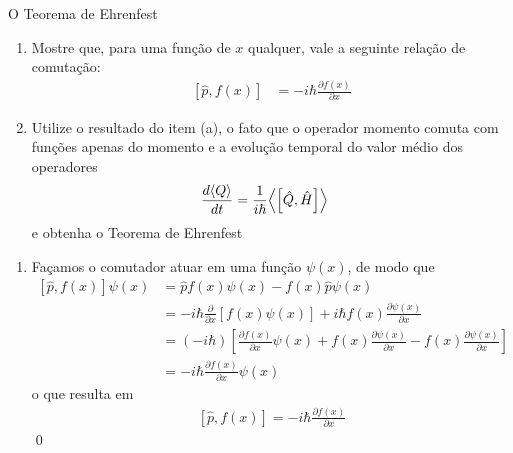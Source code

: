 \begin{prob}
	O Teorema de Ehrenfest
	\begin{enumerate}[label=\alph *)]
		\item Mostre que, para uma função de $x$ qualquer, vale a seguinte relação de comutação:
			\begin{align}
				\left[\hat{p},f(x)\right] &= -i\hbar \frac{\partial f(x)}{\partial x}
			\end{align}
		\item Utilize o resultado do item (a), o fato que o operador momento comuta com funções apenas do momento e a evolução temporal do valor médio dos operadores
			\begin{align}
				\frac{d \langle Q \rangle}{dt} &= \frac{1}{i \hbar} \Bigl\langle \left[\hat{Q}, \hat{H}\right] \Bigr\rangle
			\end{align}
			e obtenha o Teorema de Ehrenfest
	\end{enumerate}

	\begin{sol}
		\begin{enumerate}[label=\alph *)]
			\item	Façamos o comutador atuar em uma função $\psi (x)$, de modo que
				\begin{align}
					\left[\hat{p},f(x)\right] \psi(x) &= \hat{p}f(x) \psi(x)-f(x)\hat{p} \psi(x)\nonumber\\
																						&= -i \hbar \frac{\partial }{\partial x}\left[f(x) \psi(x)\right]+i \hbar f(x) \frac{\partial \psi(x)}{\partial x}\nonumber \\
																						&= \left(-i \hbar\right)\left[\frac{\partial f(x)}{\partial x} \psi(x)+f(x)\frac{\partial \psi(x)}{\partial x}-f(x)\frac{\partial \psi(x)}{\partial x}\right]\nonumber\\
																						&= -i \hbar \frac{\partial f(x)}{\partial x} \psi(x)
				\end{align}
				o que resulta em
				\begin{align}
					\boxed{
						\left[\hat{p},f(x)\right] = -i \hbar \frac{\partial f(x)}{\partial x}
					}
				\end{align}\qed


\end{enumerate}
\end{sol}
\end{prob}
